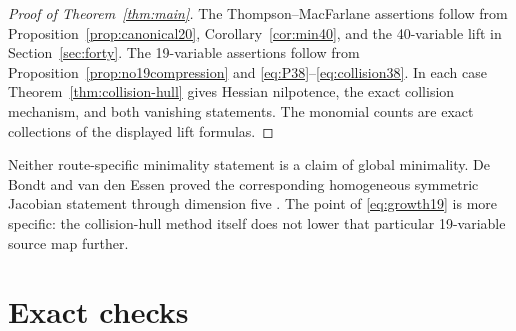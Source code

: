 \documentclass[11pt]{article}
\theoremstyle{remark}
\begin{document}
\begin{proof}[Proof of Theorem~\ref{thm:main}]
The Thompson--MacFarlane assertions follow from Proposition~\ref{prop:canonical20}, Corollary~\ref{cor:min40}, and the 40-variable lift in Section~\ref{sec:forty}. The 19-variable assertions follow from Proposition~\ref{prop:no19compression} and \eqref{eq:P38}--\eqref{eq:collision38}. In each case Theorem~\ref{thm:collision-hull} gives Hessian nilpotence, the exact collision mechanism, and both vanishing statements. The monomial counts are exact collections of the displayed lift formulas.
\end{proof}

Neither route-specific minimality statement is a claim of global minimality. De Bondt and van den Essen proved the corresponding homogeneous symmetric Jacobian statement through dimension five \citep{deBondtEssen2005b}. The point of \eqref{eq:growth19} is more specific: the collision-hull method itself does not lower that particular 19-variable source map further.

\section{Exact checks}\label{sec:checks}
\end{document}
